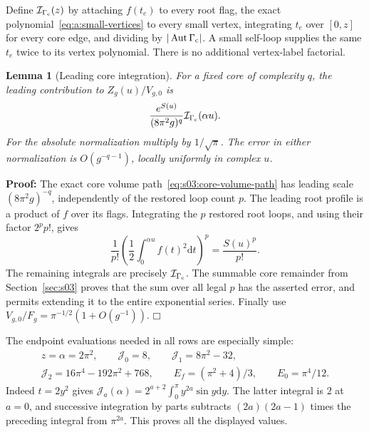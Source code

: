 \documentclass[a4paper,10pt]{article}
\numberwithin{equation}{section}
\newcommand{\dd}{\mathrm{d}}
\theoremstyle{paperplain}
\newtheorem{lmm}[thm]{Lemma}
\theoremstyle{paperremark}
\theoremstyle{paperplain}
\newenvironment{prf}{\noindent \textbf{Proof: }}{\hfill $\mdlgwhtsquare$\par\addvspace{0.5\baselineskip}}
\begin{document}
Define $\mathcal I_{\Gamma_{\rm c}}(z)$ by attaching $f(t_e)$ to
every root flag, the exact polynomial~\eqref{eq:a:small-vertices}
to every small vertex, integrating $t_e$ over $[0,z]$ for every core
edge, and dividing by $|\operatorname{Aut}\Gamma_{\rm c}|$. A small
self-loop supplies the same $t_e$ twice to its vertex polynomial.
There is no additional vertex-label factorial.

\begin{lmm}[Leading core integration]\label{lmm:a:core-integration}
For a fixed core of complexity $q$, the leading contribution to
$Z_g(u)/V_{g,0}$ is
\begin{equation}\label{eq:a:leading-core}
 \frac{e^{S(u)}}{(8\pi^2g)^q}
           \mathcal I_{\Gamma_{\rm c}}(\alpha u).
\end{equation}
For the absolute normalization multiply by $1/\sqrt\pi$. The error
in either normalization is $O(g^{-q-1})$, locally uniformly in complex $u$.
\end{lmm}
\begin{prf}
The exact core volume path~\eqref{eq:s03:core-volume-path} has
leading scale $(8\pi^2g)^{-q}$, independently of the restored loop
count $p$. The leading root profile is a product of $f$ over its
flags. Integrating the $p$ restored root loops, and using their factor
$2^pp!$, gives
\[
 \frac1{p!}\left(\frac12\int_0^{\alpha u}f(t)^2\dd t\right)^p
 =\frac{S(u)^p}{p!}.
\]
The remaining integrals are precisely $\mathcal I_{\Gamma_{\rm c}}$.
The summable core remainder from Section~\ref{sec:s03} proves that
the sum over all legal $p$ has the asserted error, and permits extending
it to the entire exponential series. Finally use
$V_{g,0}/F_g=\pi^{-1/2}(1+O(g^{-1}))$.
\end{prf}

The endpoint evaluations needed in all rows are especially simple:
\begin{equation}\label{eq:a:endpoint-moments}
\begin{gathered}
 z=\alpha=2\pi^2,\qquad \mathcal J_0=8,\qquad
 \mathcal J_1=8\pi^2-32,\\
 \mathcal J_2=16\pi^4-192\pi^2+768,\qquad
 E_f=(\pi^2+4)/3,\qquad E_0=\pi^4/12.
\end{gathered}
\end{equation}
Indeed $t=2y^2$ gives
$\mathcal J_a(\alpha)=2^{a+2}\int_0^\pi y^{2a}\sin y\dd y$.
The latter integral is $2$ at $a=0$, and successive integration by
parts subtracts $(2a)(2a-1)$ times the preceding integral from
$\pi^{2a}$. This proves all the displayed values.
\end{document}
